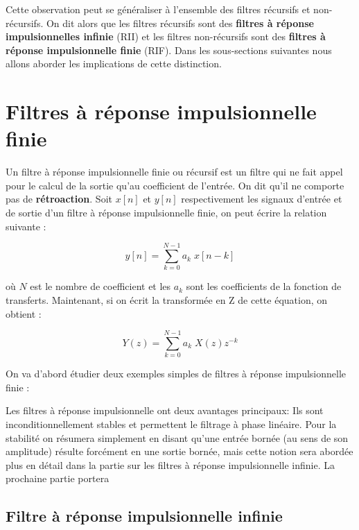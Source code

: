 \documentclass[11pt,a4paper]{article}
\begin{document}
Cette observation peut se généraliser à l'ensemble des filtres récursifs et non-récursifs. On dit alors que les filtres récursifs sont des \textbf{filtres à réponse impulsionnelles infinie} (RII) et les filtres non-récursifs sont des \textbf{filtres à réponse impulsionnelle finie} (RIF). Dans les sous-sections suivantes nous allons aborder les implications de cette distinction.

\section{Filtres à réponse impulsionnelle finie}
Un filtre à réponse impulsionnelle finie ou récursif est un filtre qui ne fait appel pour le calcul de la sortie qu'au coefficient de l'entrée. On dit qu'il ne comporte pas de \textbf{rétroaction}. Soit $x[n]$ et $y[n]$  respectivement les signaux d'entrée et de sortie d'un filtre à réponse impulsionnelle finie, on peut écrire la relation suivante : 

\[ y[n] =  \sum_{k = 0}^{N-1} a_k \; x[n-k]\] 

où $N$ est le nombre de coefficient et les $a_k$ sont les coefficients de la fonction de transferts. Maintenant, si on écrit la transformée en Z de cette équation, on obtient :

\[ Y(z) =  \sum_{k = 0}^{N-1} a_k \; X(z)z^{-k} \] 

On va d'abord étudier deux exemples simples de filtres à réponse impulsionnelle finie :



Les filtres à réponse impulsionnelle ont deux avantages principaux: Ils sont inconditionnellement stables et permettent le filtrage à phase linéaire. Pour la stabilité on résumera simplement en disant qu'une entrée bornée (au sens de son amplitude) résulte forcément en une sortie bornée, mais cette notion sera abordée plus en détail dans la partie sur les filtres à réponse impulsionnelle infinie. La prochaine partie portera   


\subsection{Filtre à réponse impulsionnelle infinie}
\end{document}
